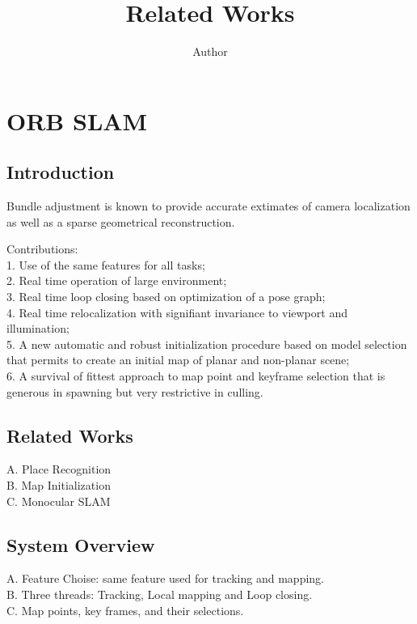 \documentclass{article}
\title{Related Works}
\author{Author}
\begin{document}
\maketitle

\section{ORB SLAM}

\subsection{Introduction}

Bundle adjustment is known to provide accurate extimates of camera localization as well as a sparse geometrical reconstruction.

Contributions:\\
1. Use of the same features for all tasks;\\
2. Real time operation of large environment;\\
3. Real time loop closing based on optimization of a pose graph;\\
4. Real time relocalization with signifiant invariance to viewport and illumination;\\
5. A new automatic and robust initialization procedure based on model selection that permits to create an initial map of planar and non-planar scene;\\
6. A survival of fittest approach to map point and keyframe selection that is generous in spawning but very restrictive in culling.

\subsection{Related Works}

A. Place Recognition\\
B. Map Initialization\\
C. Monocular SLAM

\subsection{System Overview}
A. Feature Choise: same feature used for tracking and mapping.\\
B. Three threads: Tracking, Local mapping and Loop closing.\\
C. Map points, key frames, and their selections.
\end{document}
